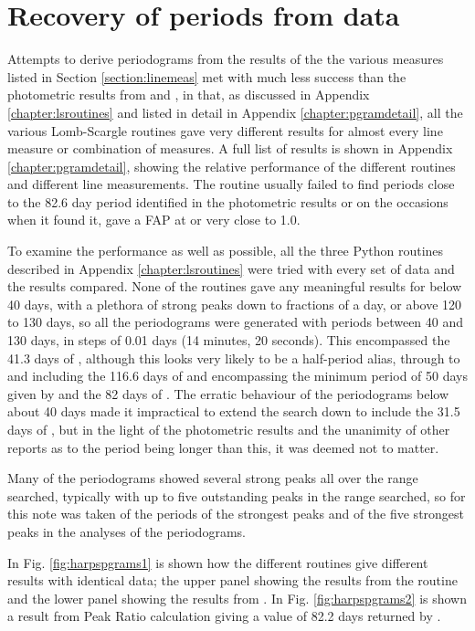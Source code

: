 \section{Recovery of periods from {\harps} data}
\protect\label{section:harpsper}

Attempts to derive periodograms from the results of the the various measures listed in Section \ref{section:linemeas}
met with much less success than the photometric results from {\asas} and {\hst}, in that, as discussed in Appendix
\ref{chapter:lsroutines} and listed in detail in Appendix \ref{chapter:pgramdetail}, all the various Lomb-Scargle
routines gave very different results for almost every line measure or combination of measures. A full list of results is
shown in Appendix \ref{chapter:pgramdetail}, showing the relative performance of the different routines and different
line measurements. The {\numrecs} routine usually failed to find periods close to the 82.6 day period identified in the
photometric results or on the occasions when it found it, gave a FAP at or very close to 1.0.

To examine the performance as well as possible, all the three Python routines described in Appendix
\ref{chapter:lsroutines} were tried with every set of data and the results compared. None of the routines gave any
meaningful results for below 40 days, with a plethora of strong peaks down to fractions of a day, or above 120 to 130
days, so all the periodograms were generated with periods between 40 and 130 days, in steps of 0.01 days (14 minutes, 20
seconds). This encompassed the 41.3 days of \citet{benedict93}, although this looks very likely to be a half-period
alias, through to and including the 116.6 days of \citet[Table 3]{suarezmascareno15} and encompassing the minimum period
of 50 days given by \citet{kurster99} and the 82 days of \citealt{benedict92,benedict98,kiraga07}. The erratic behaviour
of the periodograms below about 40 days made it impractical to extend the search down to include the 31.5 days of
\citet{guinan96}, but in the light of the photometric results and the unanimity of other reports as to the period being
longer than this, it was deemed not to matter.

Many of the periodograms showed several strong peaks all over the range searched, typically with up to five outstanding
peaks in the range searched, so for this {\paperorthesis} note was taken of the periods of the strongest peaks and of
the five strongest peaks in the analyses of the periodograms.

In Fig. \ref{fig:harpspgrams1} is shown how the different routines give different results with identical data; the upper
panel showing the results from the {\astroml} routine and the lower panel showing the results from {\gatspy}. In
Fig. \ref{fig:harpspgrams2} is shown a result from Peak Ratio calculation giving a value of 82.2 days returned by
\gatspy.

